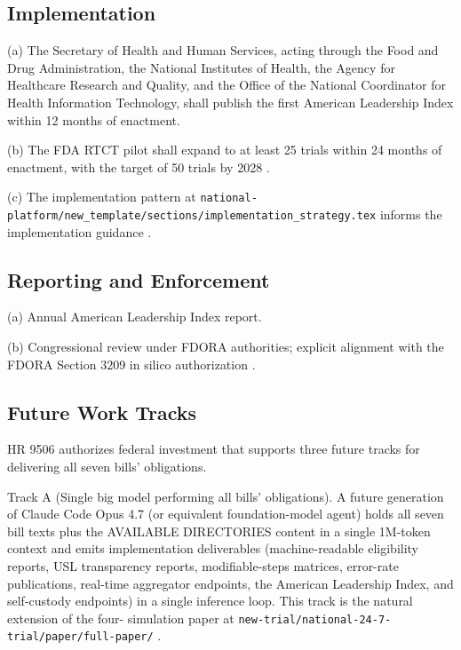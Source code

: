 \subsection{Implementation}

(a) The Secretary of Health and Human Services, acting through the
Food and Drug Administration, the National Institutes of Health,
the Agency for Healthcare Research and Quality, and the Office of
the National Coordinator for Health Information Technology, shall
publish the first American Leadership Index within 12 months of
enactment.

(b) The FDA RTCT pilot shall expand to at least 25 trials within 24
months of enactment, with the target of 50 trials by 2028
\cite{fda_rtct_press_2026}.

(c) The implementation pattern at
\texttt{national-platform/new\_template/sections/implementation\_strategy.tex}
informs the implementation guidance \cite{kawchak_2026_19244918}.

\subsection{Reporting and Enforcement}

(a) Annual American Leadership Index report.

(b) Congressional review under FDORA authorities; explicit
alignment with the FDORA Section 3209 in silico authorization
\cite{rank4_fdora_fda_modernization_2022}.

\subsection{Future Work Tracks}

HR 9506 authorizes federal investment that supports three future
tracks for delivering all seven bills' obligations.

Track A (Single big model performing all bills' obligations). A
future generation of Claude Code Opus 4.7 (or equivalent
foundation-model agent) holds all seven bill texts plus the
AVAILABLE DIRECTORIES content in a single 1M-token context and
emits implementation deliverables (machine-readable eligibility
reports, USL transparency reports, modifiable-steps matrices,
error-rate publications, real-time aggregator endpoints, the
American Leadership Index, and self-custody endpoints) in a single
inference loop. This track is the natural extension of the four-
simulation paper at
\texttt{new-trial/national-24-7-trial/paper/full-paper/}
\cite{kawchak_2026_19994945, claude_opus_47}.

